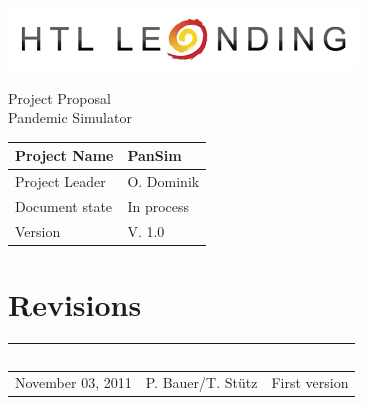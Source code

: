 \documentclass[12pt]{article}
\theoremstyle{definition}
\newcommand{\projectname}{PanSim}
\newcommand{\productname}{Pandemic Simulator}
\newcommand{\projectleader}{O. Dominik}
\newcommand{\documentstatus}{In process}
\newcommand{\version}{V. 1.0}
\begin{document}
\begin{titlepage}
\begin{flushright}
\includegraphics[scale=.5]{htlleondinglogo.png}\\
\end{flushright}

\vspace{10em}

\begin{center}
{\Huge Project Proposal} \\[3em]
{\LARGE \productname} \\[3em]
\end{center}

\begin{flushleft}
\begin{tabular}{|l|l|}
\hline
Project Name & \projectname \\ \hline
Project Leader & \projectleader \\ \hline
Document state & \documentstatus \\ \hline
Version & \version \\ \hline
\end{tabular}
\end{flushleft}

\end{titlepage}
\section*{Revisions}
\begin{tabular}{|l|l|l|}
\hline
\cellcolor[gray]{0.5}\textcolor{white}{Date} & \cellcolor[gray]{0.5}\textcolor{white}{Author} & \cellcolor[gray]{0.5}\textcolor{white}{Change} \\ \hline
November 03, 2011&P. Bauer/T. Stütz&First version \\ \hline
\end{tabular}
\pagebreak

\tableofcontents
\pagebreak
\end{document}
